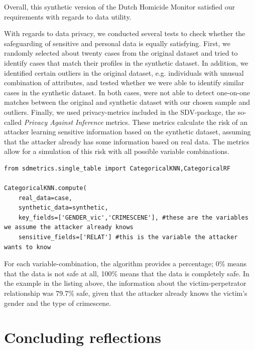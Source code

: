 Overall, this synthetic version of the Dutch Homicide Monitor satisfied our requirements with regards to data utility.

With regards to data privacy, we conducted several tests to check whether the safeguarding of sensitive and personal data is equally satisfying. First, we randomly selected about twenty cases from the original dataset and tried to identify cases that match their profiles in the synthetic dataset. In addition, we identified certain outliers in the original dataset, e.g. individuals with unusual combination of attributes, and tested whether we were able to identify similar cases in the synthetic dataset.
In both cases, were not able to detect one-on-one matches between the original and synthetic dataset with our chosen sample and outliers. Finally, we used privacy-metrics included in the SDV-package, the so-called \textit{Privacy Against Inference} metrics. These metrics calculate the risk of an attacker learning sensitive information based on the synthetic dataset, assuming that the attacker already has some information based on real data. The metrics allow for a simulation of this risk with all possible variable combinations.

\vspace{10pt}
\begin{lstlisting}[caption={SDV privacy metrics example}, label={lst:gen_first}]
from sdmetrics.single_table import CategoricalKNN,CategoricalRF

CategoricalKNN.compute(
    real_data=case,
    synthetic_data=synthetic,
    key_fields=['GENDER_vic','CRIMESCENE'], #these are the variables we assume the attacker already knows
    sensitive_fields=['RELAT'] #this is the variable the attacker wants to know
\end{lstlisting}
\vspace{10pt}

For each variable-combination, the algorithm provides a percentage; 0\% means that the data is not safe at all, 100\% means that the data is completely safe. In the example in the listing above, the information about the victim-perpetrator relationship was 79.7\% safe, given that the attacker already knows the victim's gender and the type of crimescene.


\section{Concluding reflections}

